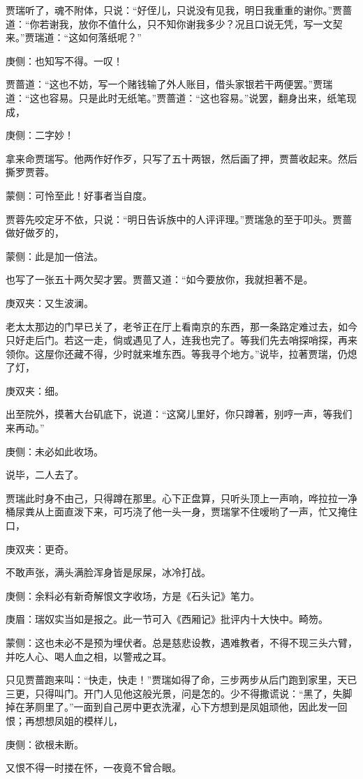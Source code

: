 \begin{parag}
    贾瑞听了，魂不附体，只说：“好侄儿，只说没有见我，明日我重重的谢你。”贾蔷道：“你若谢我，放你不值什么，只不知你谢我多少？况且口说无凭，写一文契来。”贾瑞道：“这如何落纸呢？”\begin{note}庚侧：也知写不得。一叹！\end{note}贾蔷道：“这也不妨，写一个赌钱输了外人账目，借头家银若干两便罢。”贾瑞道：“这也容易。只是此时无纸笔。”贾蔷道：“这也容易。”说罢，翻身出来，纸笔现成，\begin{note}庚侧：二字妙！\end{note}拿来命贾瑞写。他两作好作歹，只写了五十两银，然后画了押，贾蔷收起来。然后撕罗贾蓉。\begin{note}蒙侧：可怜至此！好事者当自度。\end{note}贾蓉先咬定牙不依，只说：“明日告诉族中的人评评理。”贾瑞急的至于叩头。贾蔷做好做歹的，\begin{note}蒙侧：此是加一倍法。\end{note}也写了一张五十两欠契才罢。贾蔷又道：“如今要放你，我就担著不是。\begin{note}庚双夹：又生波澜。\end{note}老太太那边的门早已关了，老爷正在厅上看南京的东西，那一条路定难过去，如今只好走后门。若这一走，倘或遇见了人，连我也完了。等我们先去哨探哨探，再来领你。这屋你还藏不得，少时就来堆东西。等我寻个地方。”说毕，拉著贾瑞，仍熄了灯，\begin{note}庚双夹：细。\end{note}出至院外，摸著大台矶底下，说道：“这窝儿里好，你只蹲著，别哼一声，等我们来再动。”\begin{note}庚侧：未必如此收场。\end{note}说毕，二人去了。
\end{parag}


\begin{parag}
    贾瑞此时身不由己，只得蹲在那里。心下正盘算，只听头顶上一声响，哗拉拉一净桶尿粪从上面直泼下来，可巧浇了他一头一身，贾瑞掌不住嗳哟了一声，忙又掩住口，\begin{note}庚双夹：更奇。\end{note}不敢声张，满头满脸浑身皆是尿屎，冰冷打战。\begin{note}庚侧：余料必有新奇解恨文字收场，方是《石头记》笔力。\end{note}\begin{note}庚眉：瑞奴实当如是报之。此一节可入《西厢记》批评内十大快中。畸笏。\end{note}\begin{note}蒙侧：这也未必不是预为埋伏者。总是慈悲设教，遇难教者，不得不现三头六臂，并吃人心、喝人血之相，以警戒之耳。\end{note}只见贾蔷跑来叫：“快走，快走！”贾瑞如得了命，三步两步从后门跑到家里，天已三更，只得叫门。开门人见他这般光景，问是怎的。少不得撒谎说：“黑了，失脚掉在茅厕里了。”一面到自己房中更衣洗濯，心下方想到是凤姐顽他，因此发一回恨；再想想凤姐的模样儿，\begin{note}庚侧：欲根未断。\end{note}又恨不得一时搂在怀，一夜竟不曾合眼。
\end{parag}


